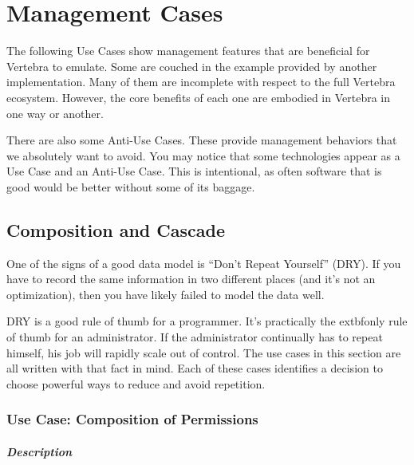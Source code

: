 \chapter{Management Cases}

The following Use Cases show management features that are beneficial for Vertebra to emulate.  Some are couched in the example provided by another implementation.  Many of them are incomplete with respect to the full Vertebra ecosystem.  However, the core benefits of each one are embodied in Vertebra in one way or another.

There are also some Anti-Use Cases.  These provide management behaviors that we absolutely want to avoid.  You may notice that some technologies appear as a Use Case and an Anti-Use Case.  This is intentional, as often software that is good would be better without some of its baggage.

\section{Composition and Cascade}

One of the signs of a good data model is ``Don't Repeat Yourself'' (DRY).  If you have to record the same information in two different places (and it's not an optimization), then you have likely failed to model the data well.

DRY is a good rule of thumb for a programmer.  It's practically the         extbf{only} rule of thumb for an administrator.  If the administrator continually has to repeat himself, his job will rapidly scale out of control.  The use cases in this section are all written with that fact in mind.  Each of these cases identifies a decision to choose powerful ways to reduce and avoid repetition.

\subsection{Use Case: Composition of Permissions}

\paragraph{Description}

